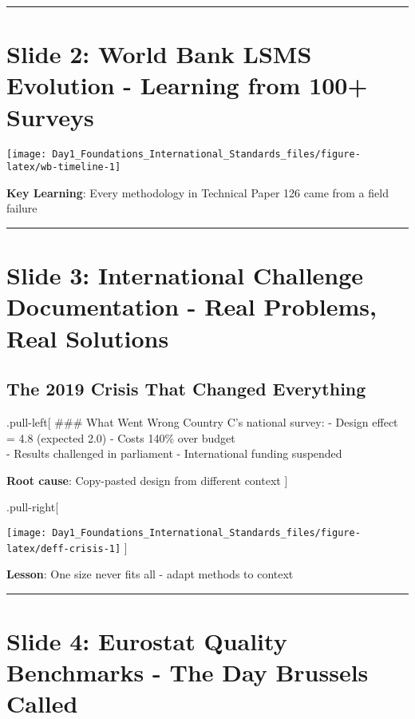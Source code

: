 \documentclass[
]{article}
\begin{document}
\begin{center}\rule{0.5\linewidth}{0.5pt}\end{center}

\section{Slide 2: World Bank LSMS Evolution - Learning from 100+
Surveys}\label{slide-2-world-bank-lsms-evolution---learning-from-100-surveys}

\texttt{[image: Day1\_Foundations\_International\_Standards\_files/figure-latex/wb-timeline-1]}

\textbf{Key Learning}: Every methodology in Technical Paper 126 came
from a field failure

\begin{center}\rule{0.5\linewidth}{0.5pt}\end{center}

\section{Slide 3: International Challenge Documentation - Real Problems,
Real
Solutions}\label{slide-3-international-challenge-documentation---real-problems-real-solutions}

\subsection{The 2019 Crisis That Changed
Everything}\label{the-2019-crisis-that-changed-everything}

.pull-left{[} \#\#\# What Went Wrong Country C's national survey: -
Design effect = 4.8 (expected 2.0) - Costs 140\% over budget\\
- Results challenged in parliament - International funding suspended

\textbf{Root cause}: Copy-pasted design from different context {]}

.pull-right{[}

\texttt{[image: Day1\_Foundations\_International\_Standards\_files/figure-latex/deff-crisis-1]}
{]}

\textbf{Lesson}: One size never fits all - adapt methods to context

\begin{center}\rule{0.5\linewidth}{0.5pt}\end{center}

\section{Slide 4: Eurostat Quality Benchmarks - The Day Brussels
Called}\label{slide-4-eurostat-quality-benchmarks---the-day-brussels-called}
\end{document}
